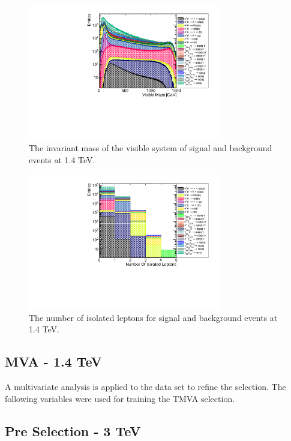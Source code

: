 \begin{figure}
\centering
\includegraphics[width=0.75\textwidth]{PhysicsAnalysis/Plots/PreSelection/1400GeV/InvariantMassSystem.pdf}
\caption[Invariant mass of the visible system at 1.4 TeV.]{The invariant mass of the visible system of signal and background events at 1.4 TeV.}
\label{fig:preselection2}
\end{figure}

\begin{figure}
\centering
\includegraphics[width=0.75\textwidth]{PhysicsAnalysis/Plots/PreSelection/1400GeV/NumberOfIsolatedLeptons.pdf}
\caption[Number of isolated leptons at 1.4 TeV.]{The number of isolated leptons for signal and background events at 1.4 TeV.}
\label{fig:preselection3}
\end{figure}

\subsection{MVA - 1.4 TeV}
A multivariate analysis is applied to the data set to refine the selection. The following variables were used for training the TMVA selection.

\subsection{Pre Selection - 3 TeV}
